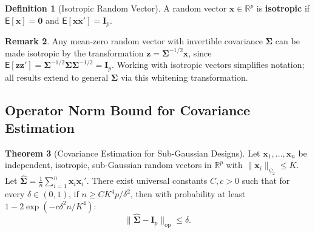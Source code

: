 \documentclass[12pt,a4paper]{article}
\theoremstyle{definition}
\newtheorem{theorem}{Theorem}[section]
\newtheorem{definition}[theorem]{Definition}
\newtheorem{remark}[theorem]{Remark}
\newcommand\expc{\mathsf{E}}
\newcommand{\bx}{\mathbf{x}}
\newcommand{\bI}{\mathbf{I}}
\newcommand{\bzero}{\mathbf{0}}
\newcommand{\bz}{\mathbf{z}}
\newcommand{\Real}{\mathbb{R}}
\newcommand{\bSigma}{\boldsymbol{\Sigma}}
\newcommand{\hbSigma}{\hat{\boldsymbol{\Sigma}}}
\newcommand{\opnorm}[1]{\|#1\|_{\mathrm{op}}}
\begin{document}
\begin{definition}[Isotropic Random Vector]\label{def:isotropic}
A random vector $\bx \in \Real^p$ is \textbf{isotropic} if $\expc[\bx] = \bzero$ and $\expc[\bx\bx'] = \bI_p$.
\end{definition}

\begin{remark}
Any mean-zero random vector with invertible covariance $\bSigma$ can be made isotropic by the transformation $\bz = \bSigma^{-1/2}\bx$, since $\expc[\bz\bz'] = \bSigma^{-1/2}\bSigma\bSigma^{-1/2} = \bI_p$. Working with isotropic vectors simplifies notation; all results extend to general $\bSigma$ via this whitening transformation.
\end{remark}

\subsection{Operator Norm Bound for Covariance Estimation}

\begin{theorem}[Covariance Estimation for Sub-Gaussian Designs]\label{thm:cov-estimation}
Let $\bx_1, \ldots, \bx_n$ be independent, isotropic, sub-Gaussian random vectors in $\Real^p$ with $\|\bx_i\|_{\psi_2} \leqslant K$. Let $\hbSigma = \frac{1}{n}\sum_{i=1}^n \bx_i\bx_i'$. There exist universal constants $C, c > 0$ such that for every $\delta \in (0, 1)$, if $n \geqslant CK^4 p/\delta^2$, then with probability at least $1 - 2\exp(-c\delta^2 n/K^4)$:
\begin{equation}\label{eq:cov-estimation}
\boxed{\opnorm{\hbSigma - \bI_p} \leqslant \delta.}
\end{equation}
\end{theorem}
\end{document}
